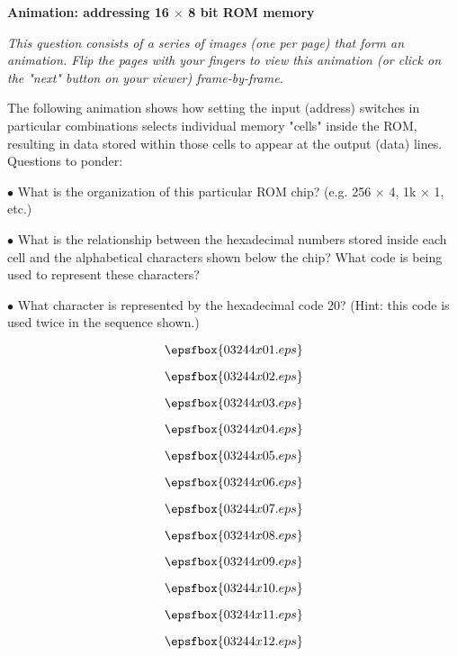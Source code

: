 

\centerline{\bf Animation: addressing 16 $\times$ 8 bit ROM memory}

\vskip 10pt

{\it This question consists of a series of images (one per page) that form an animation.  Flip the pages with your fingers to view this animation (or click on the "next" button on your viewer) frame-by-frame.}

\vskip 10pt

The following animation shows how setting the input (address) switches in particular combinations selects individual memory "cells" inside the ROM, resulting in data stored within those cells to appear at the output (data) lines.  Questions to ponder:

\medskip
\goodbreak
\item{$\bullet$} What is the organization of this particular ROM chip?  (e.g. 256 $\times$ 4, 1k $\times$ 1, etc.)
\item{$\bullet$} What is the relationship between the hexadecimal numbers stored inside each cell and the alphabetical characters shown below the chip?  What code is being used to represent these characters?
\item{$\bullet$} What character is represented by the hexadecimal code 20?  (Hint: this code is used twice in the sequence shown.)
\medskip

\vfil \eject
$$\epsfbox{03244x01.eps}$$

\vfil \eject
$$\epsfbox{03244x02.eps}$$

\vfil \eject
$$\epsfbox{03244x03.eps}$$

\vfil \eject
$$\epsfbox{03244x04.eps}$$

\vfil \eject
$$\epsfbox{03244x05.eps}$$

\vfil \eject
$$\epsfbox{03244x06.eps}$$

\vfil \eject
$$\epsfbox{03244x07.eps}$$

\vfil \eject
$$\epsfbox{03244x08.eps}$$

\vfil \eject
$$\epsfbox{03244x09.eps}$$

\vfil \eject
$$\epsfbox{03244x10.eps}$$

\vfil \eject
$$\epsfbox{03244x11.eps}$$

\vfil \eject
$$\epsfbox{03244x12.eps}$$

